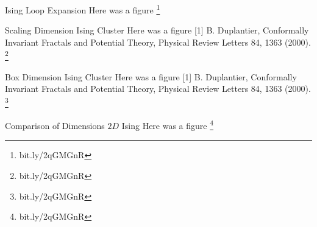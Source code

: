 \documentclass[10pt]{beamer}
\newcommand\blfootnote[1]{%
  \begingroup
  \renewcommand\thefootnote{}\footnote{#1}%
  \addtocounter{footnote}{-1}%
  \endgroup
}
\begin{document}
\begin{frame}{Ising Loop Expansion}
        Here was a figure
\blfootnote{bit.ly/2qGMGnR}
\end{frame}

\begin{frame}{Scaling Dimension Ising Cluster}
            Here was a figure
\footnotesize [1] B. Duplantier, Conformally Invariant Fractals and Potential Theory, Physical Review Letters 84, 1363 (2000).
\\
    \blfootnote{bit.ly/2qGMGnR}
\end{frame}

\begin{frame}{Box Dimension Ising Cluster}
            Here was a figure
\footnotesize [1] B. Duplantier, Conformally Invariant Fractals and Potential Theory, Physical Review Letters 84, 1363 (2000).
\\
    \blfootnote{bit.ly/2qGMGnR}
\end{frame}


\begin{frame}{Comparison of Dimensions $2D$ Ising}
          Here was a figure
    \blfootnote{bit.ly/2qGMGnR}
\end{frame}
\end{document}
